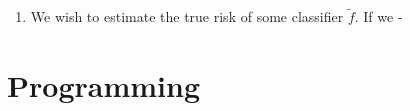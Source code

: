 \documentclass[11pt,letterpaper]{article}
\numberwithin{equation}{section}
\numberwithin{figure}{section}
\begin{document}
\begin{enumerate}
	\begin{enumerate}
		\item We wish to estimate the true risk of some classifier $\tilde{f}$. If we -
	\end{enumerate}
\end{enumerate}

























\section{Programming}
\end{document}
